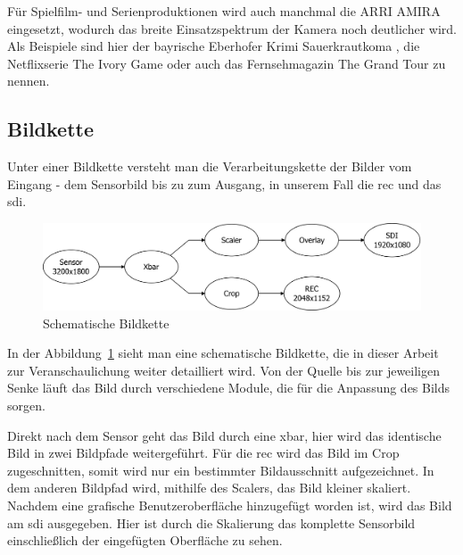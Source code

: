 Für Spielfilm- und Serienproduktionen wird auch manchmal die ARRI AMIRA eingesetzt, wodurch das breite Einsatzspektrum der Kamera noch deutlicher wird.
Als Beispiele sind hier der bayrische Eberhofer Krimi \glqq Sauerkrautkoma\grqq{} \cite{arrikrimi}, die Netflixserie \glqq The Ivory Game\grqq{} \cite{imdbivory} oder auch das Fernsehmagazin \glqq The Grand Tour\grqq{} \cite{imdbtour} zu nennen.


\subsection{Bildkette}
Unter einer Bildkette versteht man die Verarbeitungskette der Bilder vom Eingang - dem Sensorbild bis zu zum Ausgang, in unserem Fall die \ac{rec} und das \ac{sdi}.

\begin{figure}[!hbtp]
	\centering
	\includegraphics[width = \linewidth]{pictures/bildkette.png}
	\smallskip
	\caption{Schematische Bildkette}
	\label{fig:bild}
\end{figure} 

In der Abbildung~\ref{fig:bild} sieht man eine schematische Bildkette, die in dieser Arbeit zur Veranschaulichung weiter detailliert wird. 
Von der Quelle bis zur jeweiligen Senke läuft das Bild durch verschiedene Module, die für die Anpassung des Bilds sorgen. 

Direkt nach dem Sensor geht das Bild durch eine \acl{xbar}, hier wird das identische Bild in zwei Bildpfade weitergeführt. Für die \acl{rec} wird das Bild im Crop zugeschnitten, somit wird nur ein bestimmter Bildausschnitt aufgezeichnet. In dem anderen Bildpfad wird, mithilfe des Scalers, das Bild kleiner skaliert. Nachdem eine grafische Benutzeroberfläche hinzugefügt worden ist, wird das Bild am \ac{sdi} ausgegeben. Hier ist durch die Skalierung das komplette Sensorbild einschließlich der eingefügten Oberfläche zu sehen.

